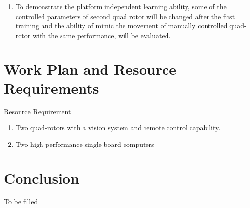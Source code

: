 \documentclass[a4paper,oneside,12pt]{report}
\begin{document}
\begin{enumerate}
\item To demonstrate the platform independent learning ability, some of the controlled parameters of second quad rotor will be changed after the first training and the ability of mimic the movement of  manually controlled quad-rotor with the same performance, will be evaluated.



\end{enumerate}

\chapter{Work Plan and Resource Requirements}
\label{ch:work plan and resource requirements}


Resource Requirement

\begin{enumerate}
\item Two quad-rotors with a vision system and remote control capability.
\item Two high performance single board computers

\end{enumerate}


\chapter{Conclusion}
\label{ch:conlusion}

To be filled 


\renewcommand{\bibname}{\normalfont\selectfont\normalsize References}


\renewcommand{\bibname}{whatever}
\end{document}
